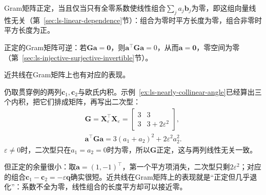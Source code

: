 Gram矩阵正定，当且仅当只有全零系数使线性组合$\sum_ja_j\bm b_j$为零，即这组向量线性无关（第~\ref{sec:ls-linear-dependence}节）：组合为零时平方长度为零，组合非零时平方长度为正。

正定的Gram矩阵可逆：若$\bm G\bm a=\bm0$，则$\bm a^\top\bm G\bm a=0$，从而$\bm a=\bm0$，零空间为零（第~\ref{sec:ls-injective-surjective-invertible}节）。

近共线在Gram矩阵上也有对应的表现。
\begin{example}[近共线两列的Gram矩阵]
\label{ex:ls-nearly-collinear-gram}
仍取贯穿例的两列$\bm c_1,\bm c_2$与欧氏内积。示例~\ref{ex:ls-nearly-collinear-angle}已经算出三个内积，把它们排成矩阵，再写出二次型：
\[
\begin{gathered}
\bm G=\bm X_\varepsilon^\top\bm X_\varepsilon=\begin{bmatrix}3&3\\3&3+2\varepsilon^2\end{bmatrix},\\
\bm a^\top\bm G\bm a=3(a_1+a_2)^2+2\varepsilon^2a_2^2 .
\end{gathered}
\]
$\varepsilon\neq0$时，二次型只在$a_1=a_2=0$时为零，所以$\bm G$正定，这与两列线性无关一致。

但正定的余量很小：取$\bm a=(1,-1)^\top$，第一个平方项消失，二次型只剩$2\varepsilon^2$；对应的组合$\bm c_1-\bm c_2=-\varepsilon\bm q$确实很短。近共线在Gram矩阵上的表现就是“正定但几乎退化”：系数不全为零，线性组合的长度平方却可以接近零。
\end{example}

